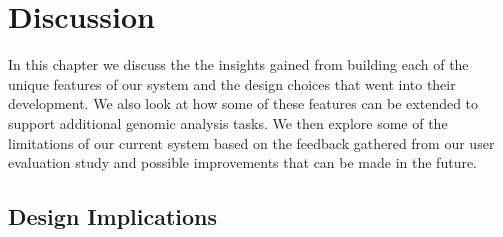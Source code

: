 \chapter{Discussion}

In this chapter we discuss the the insights gained from building each of the unique features of our system and the design choices that went into their development. We also look at how some of these features can be extended to support additional genomic analysis tasks. We then explore some of the limitations of our current system based on the feedback gathered from our user evaluation study and possible improvements that can be made in the future.

 \section{Design Implications}
 
